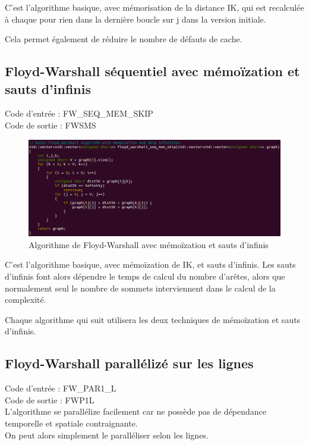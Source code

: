 \documentclass[a4paper,11pt]{article}
\begin{document}
C'est l'algorithme basique, avec mémorisation de la distance IK, qui est recalculée à chaque pour rien dans la dernière boucle sur j dans la version initiale.

Cela permet également de réduire le nombre de défauts de cache.

\subsection{Floyd-Warshall séquentiel avec mémoïzation et sauts d'infinis}

\noindent Code d'entrée : FW\_SEQ\_MEM\_SKIP \\
Code de sortie : FWSMS

\begin{figure}[H]
\begin{center}
  \includegraphics[scale=0.6]{FW_SEQ_MEM_SKIP.png}
  \caption{Algorithme de Floyd-Warshall avec mémoïzation et sauts d'infinis}
\end{center}
\end{figure}

C'est l'algorithme basique, avec mémoïzation de IK, et sauts d'infinis. Les sauts d'infinis font alors dépendre le temps de calcul du nombre d'arêtes, alors que normalement seul le nombre de sommets interviennent dans le calcul de la complexité.

Chaque algorithme qui suit utilisera les deux techniques de mémoïzation et sauts d'infinis.

\subsection{Floyd-Warshall parallélizé sur les lignes}

\noindent Code d'entrée : FW\_PAR1\_L \\
Code de sortie : FWP1L\\

L'algorithme se parallélize facilement car ne possède pas de dépendance temporelle et spatiale contraignante.\\
On peut alors simplement le paralléliser selon les lignes.\\
\end{document}
